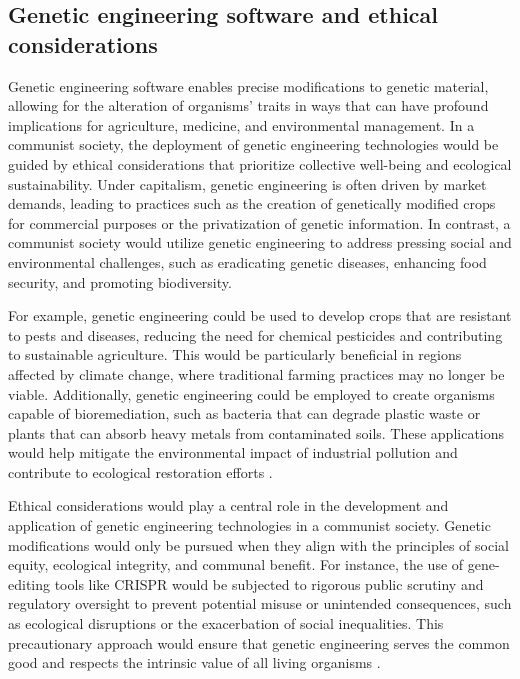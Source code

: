 \subsection{Genetic engineering software and ethical considerations}

Genetic engineering software enables precise modifications to genetic material, allowing for the alteration of organisms' traits in ways that can have profound implications for agriculture, medicine, and environmental management. In a communist society, the deployment of genetic engineering technologies would be guided by ethical considerations that prioritize collective well-being and ecological sustainability. Under capitalism, genetic engineering is often driven by market demands, leading to practices such as the creation of genetically modified crops for commercial purposes or the privatization of genetic information. In contrast, a communist society would utilize genetic engineering to address pressing social and environmental challenges, such as eradicating genetic diseases, enhancing food security, and promoting biodiversity.

For example, genetic engineering could be used to develop crops that are resistant to pests and diseases, reducing the need for chemical pesticides and contributing to sustainable agriculture. This would be particularly beneficial in regions affected by climate change, where traditional farming practices may no longer be viable. Additionally, genetic engineering could be employed to create organisms capable of bioremediation, such as bacteria that can degrade plastic waste or plants that can absorb heavy metals from contaminated soils. These applications would help mitigate the environmental impact of industrial pollution and contribute to ecological restoration efforts \cite[pp.~45-50]{patel2017biotechnology}.

Ethical considerations would play a central role in the development and application of genetic engineering technologies in a communist society. Genetic modifications would only be pursued when they align with the principles of social equity, ecological integrity, and communal benefit. For instance, the use of gene-editing tools like CRISPR would be subjected to rigorous public scrutiny and regulatory oversight to prevent potential misuse or unintended consequences, such as ecological disruptions or the exacerbation of social inequalities. This precautionary approach would ensure that genetic engineering serves the common good and respects the intrinsic value of all living organisms \cite[pp.~110-115]{garcia2019genetics}.

